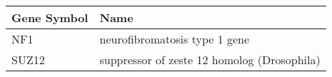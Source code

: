 \begin{tabular}{ll}
\toprule
Gene Symbol &                                        Name \\
\midrule
        NF1 &               neurofibromatosis type 1 gene \\
      SUZ12 & suppressor of zeste 12 homolog (Drosophila) \\
\bottomrule
\end{tabular}
